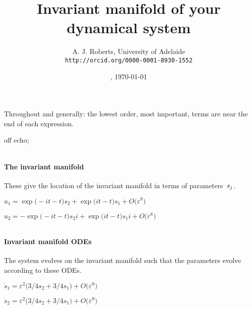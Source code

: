 \documentclass[11pt,a5paper]{article}
\title{Invariant manifold of your dynamical system}
\author{A. J. Roberts, University of Adelaide\\
\texttt{http://orcid.org/0000-0001-8930-1552}}
\date{\now, \today}
\def\eps{\varepsilon} \def\_{_}
\begin{document}
\maketitle
Throughout and generally: the lowest order, most
important, terms are near the end of each expression.


off echo;


\(
\)
\paragraph{The invariant manifold}
These give the location of the invariant manifold in
terms of parameters~\(s\sb j\).
\(
\)\par

\(u_{1}=\exp \big(-i t-t\big) s_{2}+\exp \big(i t-t\big) s_{1}+O\big(
\varepsilon ^{8}\big)
\)\par

\(u_{2}=-\exp \big(-i t-t\big) s_{2} i+\exp \big(i t-t\big) s_{1} i+O\big(
\varepsilon ^{8}\big)
\)\par

\(
\)
\paragraph{Invariant manifold ODEs}
The system evolves on the invariant manifold such
that the parameters evolve according to these ODEs.
\(
\)\par

\(\dot s_{1}=\eps^{2} \big(3/4 s_{2}+3/4 s_{1}\big)+O\big(\varepsilon ^{9}
\big)
\)\par

\(\dot s_{2}=\eps^{2} \big(3/4 s_{2}+3/4 s_{1}\big)+O\big(\varepsilon ^{9}
\big)
\)\par

\(
\)\par
\end{document}
